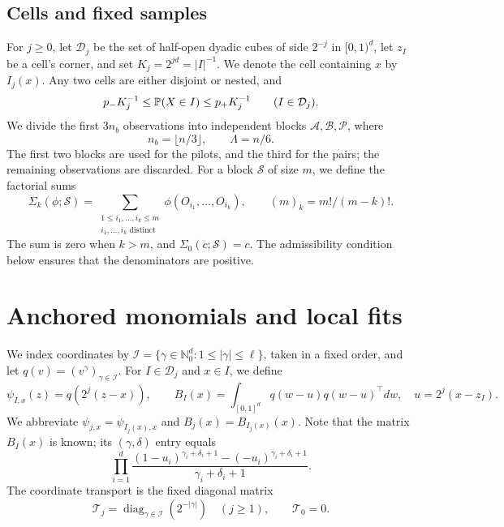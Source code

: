 \subsection*{Cells and fixed samples}
For $j\ge0$, let $\mathcal D_j$ be the set of half-open dyadic cubes
of side $2^{-j}$ in $[0,1)^d$, let $z_I$ be a cell's corner, and set
$K_j=2^{jd}=|I|^{-1}$. We denote the cell containing $x$ by $I_j(x)$.
Any two cells are either disjoint or nested, and
\begin{equation}\label{eq:U-setup-cellprob}
 p_-K_j^{-1}\le\mathbb P(X\in I)\le p_+K_j^{-1}
 \qquad(I\in\mathcal D_j).
\end{equation}
We divide the first $3n_b$ observations into independent blocks
$\mathcal A,\mathcal B,\mathcal P$, where
\begin{equation}\label{eq:U-setup-Lambda}
 n_b=\lfloor n/3\rfloor,\qquad \Lambda=n/6.
\end{equation}
The first two blocks are used for the pilots, and the third for the
pairs; the remaining observations are discarded. For a block
$\mathcal S$ of size $m$, we define the factorial sums
\begin{equation}\label{eq:U-setup-Sigma}
 \Sigma_k(\phi;\mathcal S)
 =\sum_{\substack{1\le i_1,\ldots,i_k\le m\\
                    i_1,\ldots,i_k\text{ distinct}}}
             \phi(O_{i_1},\ldots,O_{i_k}),
 \qquad (m)_k=m!/(m-k)!.
\end{equation}
The sum is zero when $k>m$, and $\Sigma_0(c;\mathcal S)=c$. The
admissibility condition below ensures that the denominators are
positive.

\section{Anchored monomials and local fits}\label{sec:U-anchored}

We index coordinates by
$\mathcal I=\{\gamma\in\mathbb N_0^d:1\le|\gamma|\le\ell\}$, taken in a
fixed order, and let $q(v)=(v^\gamma)_{\gamma\in\mathcal I}$.
For $I\in\mathcal D_j$ and $x\in I$, we define
\begin{equation}\label{eq:Udef-features}
 \psi_{I,x}(z)=q(2^j(z-x)),\qquad
 B_I(x)=\int_{[0,1]^d}q(w-u)q(w-u)^\top dw,
 \quad u=2^j(x-z_I).
\end{equation}
We abbreviate $\psi_{j,x}=\psi_{I_j(x),x}$ and
$B_j(x)=B_{I_j(x)}(x)$. Note that the matrix $B_I(x)$ is known; its
$(\gamma,\delta)$ entry equals
\[
 \prod_{i=1}^d
 \frac{(1-u_i)^{\gamma_i+\delta_i+1}
                 -(-u_i)^{\gamma_i+\delta_i+1}}
      {\gamma_i+\delta_i+1}.
\]
The coordinate transport is the fixed diagonal matrix
\begin{equation}\label{eq:U-setup-transport}
 \mathcal T_j=\operatorname{diag}_{\gamma\in\mathcal I}(2^{-|\gamma|})
 \quad(j\ge1),\qquad \mathcal T_0=0.
\end{equation}

